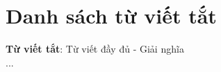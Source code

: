 \clearpage
{}

\chapter*{Danh sách từ viết tắt}


\noindent \textbf{Từ viết tắt}: Từ viết đầy đủ - Giải nghĩa \\

\noindent ...